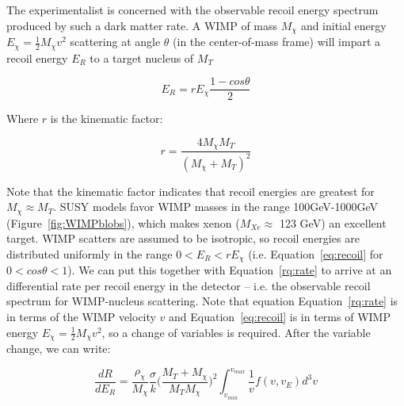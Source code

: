 

The experimentalist is concerned with the observable recoil energy spectrum produced by such a dark matter rate. A \ac{WIMP} of mass $M_{\chi}$ and initial energy $E_{\chi} = \frac{1}{2}M_{\chi}v^{2}$ scattering at angle $\theta$ (in the center-of-mass frame) will impart a recoil energy $E_{R}$ to a target nucleus of $M_{T}$

\begin{equation}
\label{eq:recoil}
E_{R} = r E_{\chi} \frac{1 - cos\theta}{2}
\end{equation}

Where $r$ is the kinematic factor:

\begin{equation}
r = \frac{ 4 M_{\chi}M_{T} }{ (M_{\chi} + M_{T})^{2}}
\end{equation}

Note that the kinematic factor indicates that recoil energies are greatest for $M_{\chi} \approx M_{T}$. SUSY models favor \ac{WIMP} masses in the range 100GeV-1000GeV (Figure~\ref{fig:WIMPblobs}), which makes xenon ($M_{Xe} \approx$ 123 GeV) an excellent target. \ac{WIMP} scatters are assumed to be isotropic, so recoil energies are distributed uniformly in the range $0 < E_{R} < rE_{\chi}$ (i.e. Equation~\ref{eq:recoil} for $0 < cos\theta < 1$). We can put this together with Equation~\ref{rq:rate} to arrive at an differential rate per recoil energy in the detector -- i.e. the observable recoil spectrum for \ac{WIMP}-nucleus scattering. Note that equation Equation~\ref{rq:rate} is in terms of the \ac{WIMP} velocity $v$ and Equation~\ref{eq:recoil} is in terms of \ac{WIMP} energy $E_{\chi} = \frac{1}{2}M_{\chi}v^{2}$, so a change of variables is required. After the variable change, we can write:

\begin{equation}
\label{ref:dRdEr}
\frac{dR}{dE_{R}} =  \frac{\rho_{\chi}}{M_{\chi}} \frac{\sigma}{k} \Big( \frac{ M_{T} + M_{\chi}}{M_{T} M_{\chi}} \Big)^{2} \int_{v_{min}}^{v_{max}} \frac{1}{v} f(v,v_{E}) d^{3}v
\end{equation}

